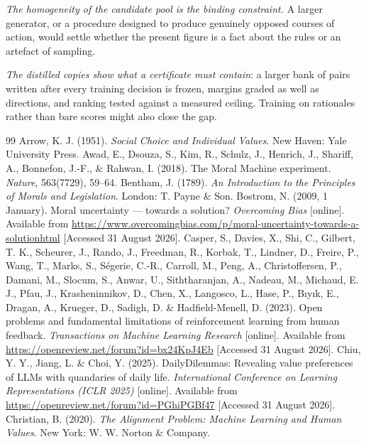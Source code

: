 \documentclass[10pt,twocolumn,a4paper]{article}
\begin{document}
\emph{The homogeneity of the candidate pool is the binding
constraint.} A larger generator, or a procedure designed to produce
genuinely opposed courses of action, would settle whether the present
figure is a fact about the rules or an artefact of sampling.

\emph{The distilled copies show what a certificate must contain}: a
larger bank of pairs written after every training decision is frozen,
margins graded as well as directions, and ranking tested against a
measured ceiling. Training on rationales rather than bare scores might
also close the gap.

\label{sec:bib}
\begin{thebibliography}{99}
\footnotesize
{} Arrow, K. J. (1951). \textit{Social Choice and Individual Values}. New Haven: Yale University Press.
 Awad, E., Dsouza, S., Kim, R., Schulz, J., Henrich, J., Shariff, A., Bonnefon, J.-F., \& Rahwan, I. (2018). The Moral Machine experiment. \textit{Nature}, 563(7729), 59--64.
 Bentham, J. (1789). \textit{An Introduction to the Principles of Morals and Legislation}. London: T. Payne \& Son.
 Bostrom, N. (2009, 1 January). Moral uncertainty --- towards a solution? \textit{Overcoming Bias} [online]. Available from \url{https://www.overcomingbias.com/p/moral-uncertainty-towards-a-solutionhtml} [Accessed 31 August 2026].
 Casper, S., Davies, X., Shi, C., Gilbert, T. K., Scheurer, J., Rando, J., Freedman, R., Korbak, T., Lindner, D., Freire, P., Wang, T., Marks, S., S\'egerie, C.-R., Carroll, M., Peng, A., Christoffersen, P., Damani, M., Slocum, S., Anwar, U., Siththaranjan, A., Nadeau, M., Michaud, E. J., Pfau, J., Krasheninnikov, D., Chen, X., Langosco, L., Hase, P., B{\i}y{\i}k, E., Dragan, A., Krueger, D., Sadigh, D. \& Hadfield-Menell, D. (2023). Open problems and fundamental limitations of reinforcement learning from human feedback. \textit{Transactions on Machine Learning Research} [online]. Available from \url{https://openreview.net/forum?id=bx24KpJ4Eb} [Accessed 31 August 2026].
 Chiu, Y. Y., Jiang, L. \& Choi, Y. (2025). DailyDilemmas: Revealing value preferences of LLMs with quandaries of daily life. \textit{International Conference on Learning Representations (ICLR 2025)} [online]. Available from \url{https://openreview.net/forum?id=PGhiPGBf47} [Accessed 31 August 2026].
 Christian, B. (2020). \textit{The Alignment Problem: Machine Learning and Human Values}. New York: W. W. Norton \& Company.

\end{thebibliography}
\end{document}
